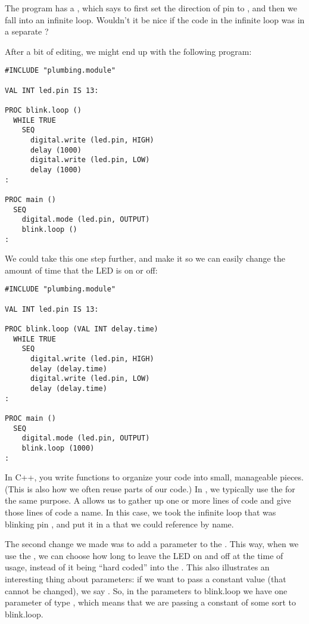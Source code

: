 The program has a \SEQ, which says to first set the direction of pin \pinthirteen to \OUTPUT, and then we fall into an infinite loop. Wouldn't it be nice if the code in the infinite loop was in a separate \PROC?

After a bit of editing, we might end up with the following program:

\begin{lstlisting}
#INCLUDE "plumbing.module"

VAL INT led.pin IS 13:

PROC blink.loop ()
  WHILE TRUE
    SEQ
      digital.write (led.pin, HIGH)
      delay (1000)
      digital.write (led.pin, LOW)
      delay (1000)
:

PROC main ()
  SEQ
    digital.mode (led.pin, OUTPUT)
    blink.loop ()
:
\end{lstlisting}

We could take this one step further, and make it so we can easily change the amount of time that the LED is on or off:

\begin{lstlisting}
#INCLUDE "plumbing.module"

VAL INT led.pin IS 13:

PROC blink.loop (VAL INT delay.time)
  WHILE TRUE
    SEQ
      digital.write (led.pin, HIGH)
      delay (delay.time)
      digital.write (led.pin, LOW)
      delay (delay.time)
:

PROC main ()
  SEQ
    digital.mode (led.pin, OUTPUT)
    blink.loop (1000)
:
\end{lstlisting}

\discussion
In C++, you write functions to organize your code into small, manageable pieces. (This is also how we often reuse parts of our code.) In \occam, we typically use the \PROC for the same purpose. A \PROC allows us to gather up one or more lines of code and give those lines of code a name. In this case, we took the infinite loop that was blinking pin \pinthirteen, and put it in a \PROC that we could reference by name.

The second change we made was to add a parameter to the \PROC. This way, when we use the \PROC, we can choose how long to leave the LED on and off at the time of usage, instead of it being ``hard coded'' into the . This also illustrates an interesting thing about \occam parameters: if we want to pass a constant value (that cannot be changed), we say \VAL. So, in the parameters to {\code blink.loop} we have one parameter of type \VAL \INT, which means that we are passing a constant of some sort to {\code blink.loop}.

